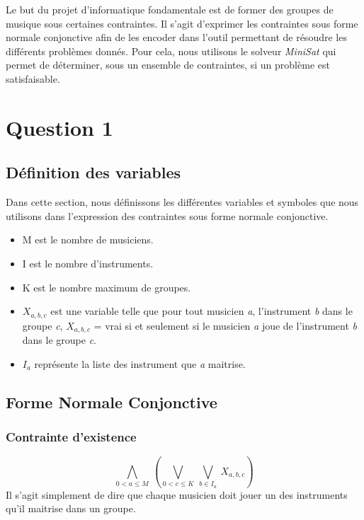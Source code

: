 \documentclass[11pt]{article}
\begin{document}
Le but du projet d'informatique fondamentale est de former des groupes de musique sous certaines contraintes. Il s'agit d'exprimer les contraintes sous forme normale conjonctive afin de les encoder dans l'outil permettant de résoudre les différents problèmes donnés. Pour cela, nous utilisons le solveur \textit{MiniSat} qui permet de déterminer, sous un ensemble de contraintes, si un problème est satisfaisable.

\section{Question 1}

\subsection{Définition des variables}

Dans cette section, nous définissons les différentes variables et symboles que nous utilisons dans l'expression des contraintes sous forme normale conjonctive.

\begin{itemize}
\item M est le nombre de musiciens.
\item I est le nombre d'instruments.
\item K est le nombre maximum de groupes.
\item $X_{a,b,c}$ est une variable telle que pour tout musicien \textit{a}, l'instrument \textit{b} dans le groupe \textit{c}, $X_{a,b,c}$ = vrai si et seulement si le musicien \textit{a} joue de l’instrument \textit{b} dans le groupe \textit{c}.
\item $I_a$ représente la liste des instrument que \textit{a} maitrise.
\end{itemize}

\subsection{Forme Normale Conjonctive}

\subsubsection{Contrainte d'existence}

$$\bigwedge\limits_{0<a\le M}\ \left(\bigvee\limits_{0<c\le K}\ \bigvee\limits_{b\in I_a}\ X_{a,b,c}\right)$$
Il s'agit simplement de dire que chaque musicien doit jouer un des instruments qu'il maitrise dans un groupe.
\end{document}
